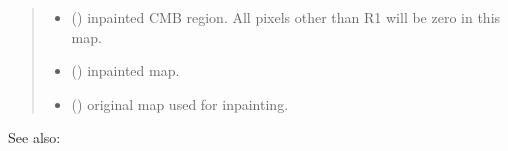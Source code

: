 \documentclass[letterpaper,10pt,english]{sphinxmanual}
\begin{document}
\begin{fulllineitems}
\begin{quote}
\begin{description}
\begin{itemize}
\end{itemize}

\sphinxAtStartPar
\begin{itemize}
\item {} 
\sphinxAtStartPar
{} () \textendash{} inpainted CMB region. All pixels other than R1 will be zero in this map.

\item {} 
\sphinxAtStartPar
{} () \textendash{} inpainted map.

\item {} 
\sphinxAtStartPar
{} () \textendash{} original map used for inpainting.

\end{itemize}


\end{description}\end{quote}


\begin{sphinxseealso}{See also:}

\sphinxAtStartPar
{\hyperref[\detokenize{inpaint:inpaint.get_covariance}]{}}


\end{sphinxseealso}


\end{fulllineitems}

\end{document}
